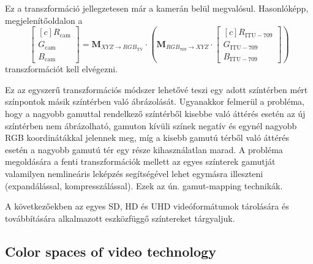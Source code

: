 Ez a transzformáció jellegzetesen már a kamerán belül megvalósul.
%
Hasonlóképp, megjelenítőoldalon a
\begin{equation} 
\begin{bmatrix}[c]
       R_{\mathrm{cam}} \\[0.3em]
       G_{\mathrm{cam}} \\[0.3em]
       B_{\mathrm{cam}} \end{bmatrix}
       =
       \mathbf{M}_{ X\!Y\!Z \rightarrow R\!G\!B_{\mathrm{TV}} } \cdot 
\left(     \mathbf{M}_{R\!G\!B_{709}  \rightarrow X\!Y\!Z } \cdot
\begin{bmatrix}[c]
       R_{\mathrm{ITU}-709} \\[0.3em]
       G_{\mathrm{ITU}-709} \\[0.3em]
       B_{\mathrm{ITU}-709} \end{bmatrix}
 \right)
\end{equation}
transzformációt kell elvégezni.

Ez az egyszerű transzformációs módszer lehetővé teszi egy adott színtérben mért színpontok másik színtérben való ábrázolását.
Ugyanakkor felmerül a probléma, hogy a nagyobb gamuttal rendelkező színtérből kisebbe való áttérés esetén az új színtérben nem ábrázolható, gamuton kívüli színek negatív és egynél nagyobb RGB koordinátákkal jelennek meg, míg a kisebb gamutú térből való áttérés esetén a nagyobb gamutú tér egy része kihasználatlan marad.
A probléma megoldására a fenti transzformációk mellett az egyes színterek gamutját valamilyen nemlineáris leképzés segítségével lehet egymásra illeszteni (expandálással, kompresszálással).
Ezek az ún. gamut-mapping technikák.

A következőekben az egyes SD, HD és UHD videóformátumok tárolására és továbbítására alkalmazott eszközfüggő színtereket tárgyaljuk.

\subsection{Color spaces of video technology}

